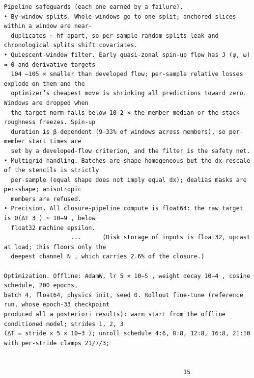 \documentclass[letterpaper]{article}
\begin{document}
\begin{Verbatim}[fontsize=\fontsize{6.35}{7.15}\selectfont,breaklines=false]
Pipeline safeguards (each one earned by a failure).
• By-window splits. Whole windows go to one split; anchored slices within a window are near-
  duplicates ∼ hf apart, so per-sample random splits leak and chronological splits shift covariates.
• Quiescent-window filter. Early quasi-zonal spin-up flow has J (ψ, ω) ≈ 0 and derivative targets
  104 –105 × smaller than developed flow; per-sample relative losses explode on them and the
  optimizer’s cheapest move is shrinking all predictions toward zero. Windows are dropped when
  the target norm falls below 10−2 × the member median or the stack roughness freezes. Spin-up
  duration is β-dependent (9–33% of windows across members), so per-member start times are
  set by a developed-flow criterion, and the filter is the safety net.
• Multigrid handling. Batches are shape-homogeneous but the dx-rescale of the stencils is strictly
  per-sample (equal shape does not imply equal dx); dealias masks are per-shape; anisotropic
  members are refused.
• Precision. All closure-pipeline compute is float64: the raw target is O(∆T 3 ) ≈ 10−9 , below
  float32 machine epsilon.
                   ...      (Disk storage of inputs is float32, upcast at load; this floors only the
  deepest channel N , which carries 2.6% of the closure.)

Optimization. Offline: AdamW, lr 5 × 10−5 , weight decay 10−4 , cosine schedule, 200 epochs,
batch 4, float64, physics init, seed 0. Rollout fine-tune (reference run, whose epoch-33 checkpoint
produced all a posteriori results): warm start from the offline conditioned model; strides 1, 2, 3
(∆T = stride × 5 × 10−3 ); unroll schedule 4:6, 8:8, 12:8, 16:8, 21:10 with per-stride clamps 21/7/3;


                                                   15
\end{Verbatim}
\newpage
\end{document}
